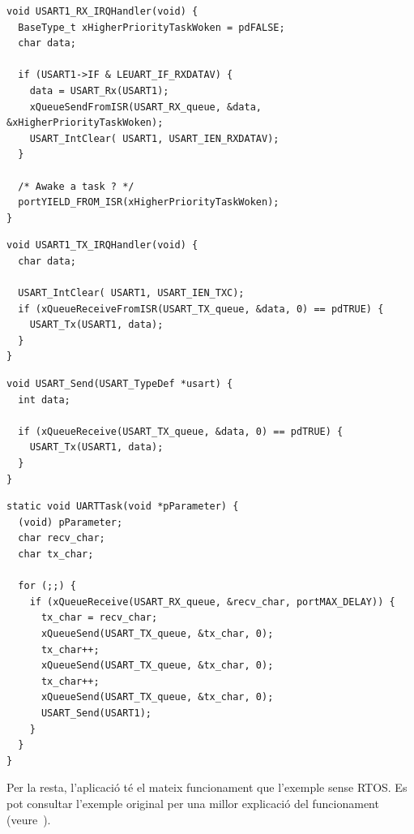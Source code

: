  \begin{lstlisting}[style=customc,caption={ISR de RX de la UART amb FreeRTOS}]
void USART1_RX_IRQHandler(void) {
  BaseType_t xHigherPriorityTaskWoken = pdFALSE;
  char data;

  if (USART1->IF & LEUART_IF_RXDATAV) {
    data = USART_Rx(USART1);
    xQueueSendFromISR(USART_RX_queue, &data, &xHigherPriorityTaskWoken);
    USART_IntClear( USART1, USART_IEN_RXDATAV);
  }

  /* Awake a task ? */
  portYIELD_FROM_ISR(xHigherPriorityTaskWoken);
}
\end{lstlisting}

\begin{lstlisting}[style=customc,caption={ISR de TX de la UART amb FreeRTOS}]
void USART1_TX_IRQHandler(void) {
  char data;

  USART_IntClear( USART1, USART_IEN_TXC);
  if (xQueueReceiveFromISR(USART_TX_queue, &data, 0) == pdTRUE) {
    USART_Tx(USART1, data);
  }
}
\end{lstlisting}

\begin{lstlisting}[style=customc,caption={funció UART\_Send() per FreeRTOS}]
void USART_Send(USART_TypeDef *usart) {
  int data;

  if (xQueueReceive(USART_TX_queue, &data, 0) == pdTRUE) {
    USART_Tx(USART1, data);
  }
}
\end{lstlisting}

\begin{lstlisting}[style=customc,caption=Tasca principal de l'exemple]
static void UARTTask(void *pParameter) {
  (void) pParameter;
  char recv_char;
  char tx_char;

  for (;;) {
    if (xQueueReceive(USART_RX_queue, &recv_char, portMAX_DELAY)) {
      tx_char = recv_char;
      xQueueSend(USART_TX_queue, &tx_char, 0);
      tx_char++;
      xQueueSend(USART_TX_queue, &tx_char, 0);
      tx_char++;
      xQueueSend(USART_TX_queue, &tx_char, 0);
      USART_Send(USART1);
    }
  }
}
\end{lstlisting}


Per la resta, l'aplicació té el mateix funcionament que l'exemple sense RTOS. Es pot consultar l'exemple original per una millor explicació del funcionament (veure~).



